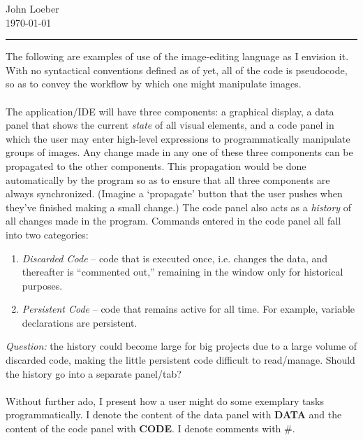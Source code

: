 \documentclass[12pt]{article}
\theoremstyle{remark}
\begin{document}
\hfill John Loeber\\
 \hfill \today
\vspace{1.2pt}
\hrule
\vspace*{1.8mm}
$$$$
\noindent 
The following are examples of use of the image-editing language as I envision it. With no syntactical conventions defined as of yet, all of the code is pseudocode, so as to convey the workflow by which one might manipulate images.
\\\\
The application/IDE will have three components: a graphical display, a data panel that shows the current \textit{state} of all visual elements, and a code panel in which the user may enter high-level expressions to programmatically manipulate groups of images. Any change made in any one of these three components can be propagated to the other components. This propagation would be done automatically by the program so as to ensure that all three components are always synchronized. (Imagine a `propagate' button that the user pushes when they've finished making a small change.) The code panel also acts as a \textit{history} of all changes made in the program. Commands entered in the code panel all fall into two categories: 
\begin{enumerate}
\item \textit{Discarded Code} -- code that is executed once, i.e. changes the data, and thereafter is ``commented out,'' remaining in the window only for historical purposes.
\item \textit{Persistent Code} -- code that remains active for all time. For example, variable declarations are persistent.
\end{enumerate}
\textit{Question:} the history could become large for big projects due to a large volume of discarded code, making the little persistent code difficult to read/manage. Should the history go into a separate panel/tab?
\\\\
Without further ado, I present how a user might do some exemplary tasks programmatically. I denote the content of the data panel with \textbf{DATA} and the content of the code panel with \textbf{CODE}. I denote comments with \#.
\newpage
\end{document}

